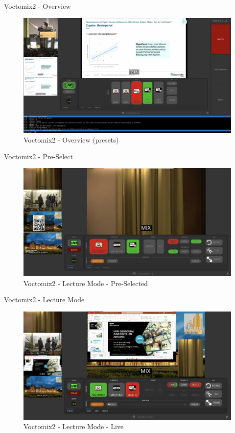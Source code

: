 
\begin{frame}{Voctomix2 - Overview}
	\begin{figure}
		\centering
		\includegraphics[width=.8\textwidth]{images/voctomix2-overview.jpg}
		\caption{Voctomix2 - Overview (presets)}
	\end{figure}
\end{frame}

\begin{frame}{Voctomix2 - Pre-Select}
	\begin{figure}
		\centering
		\includegraphics[width=.9\textwidth]{images/voctomix2-lecture_select.jpg}
		\caption{Voctomix2 - Lecture Mode - Pre-Selected}
	\end{figure}
\end{frame}

\begin{frame}{Voctomix2 - Lecture Mode}
	\begin{figure}
		\centering
		\includegraphics[width=.9\textwidth]{images/voctomix2-lecture.jpg}
		\caption{Voctomix2 - Lecture Mode - Live}
	\end{figure}
\end{frame}

